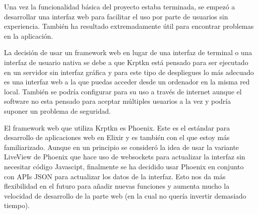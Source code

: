 Una vez la funcionalidad básica del proyecto estaba terminada, se empezó a desarrollar una interfaz web para facilitar el uso por parte de usuarios sin experiencia. También ha resultado extremadamente útil para encontrar problemas en la aplicación.

La decisión de usar un framework web en lugar de una interfaz de terminal o una interfaz de usuario nativa se debe a que Krptkn está pensado para ser ejecutado en un servidor sin interfaz gráfica y para este tipo de despliegues lo más adecuado es una interfaz web a la que puedas acceder desde un ordenador en la misma red local. También se podría configurar para su uso a través de internet aunque el software no esta pensado para aceptar múltiples usuarios a la vez y podría suponer un problema de seguridad.

El framework web que utiliza Krptkn es Phoenix. Este es el estándar para desarrollo de aplicaciones web en Elixir y es también con el que estoy más familiarizado. Aunque en un principio se consideró la idea de usar la variante LiveView de Phoenix que hace uso de websockets para actualizar la interfaz sin necesitar código Javascipt, finalmente se ha decidido usar Phoenix en conjunto con APIs JSON para actualizar los datos de la interfaz. Esto nos da más flexibilidad en el futuro para añadir nuevas funciones y aumenta mucho la velocidad de desarrollo de la parte web (en la cual no quería invertir demasiado tiempo).